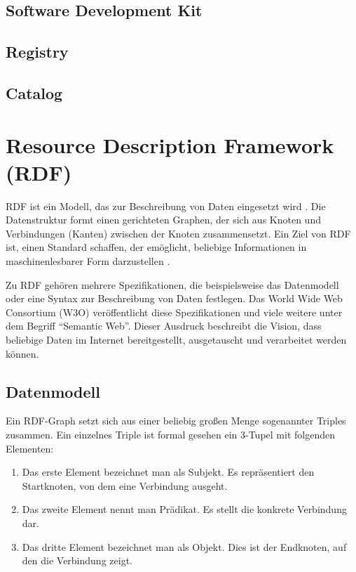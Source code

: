 	\subsection{Software Development Kit}
	\subsection{Registry}
	\subsection{Catalog}

\section{Resource Description Framework (RDF)}

\gls{RDF} ist ein Modell, das zur Beschreibung von Daten eingesetzt wird \cite[vgl.][]{w3c2014rdf}. Die Datenstruktur formt einen gerichteten Graphen, der sich aus Knoten und Verbindungen (Kanten) zwischen der Knoten zusammensetzt. Ein Ziel von RDF ist, einen Standard schaffen, der emöglicht, beliebige Informationen in maschinenlesbarer Form darzustellen \cite[vgl.][Sektion 2]{w3c2014rdfprimer}.

Zu RDF gehören mehrere Spezifikationen, die beispielsweise das Datenmodell oder eine Syntax zur Beschreibung von Daten festlegen. Das World Wide Web Consortium (W3O) veröffentlicht diese Spezifikationen und viele weitere unter dem Begriff "`Semantic Web"'. Dieser Ausdruck beschreibt die Vision, dass beliebige Daten im Internet bereitgestellt, ausgetauscht und verarbeitet werden können. \cite[vgl.][]{w3c2014semanticweb}

	\subsection{Datenmodell}
	
	Ein RDF-Graph setzt sich aus einer beliebig großen Menge sogenannter Triples zusammen. \cite[vgl.][Sektion 3.1]{w3c2014rdfconcepts} Ein einzelnes Triple ist formal gesehen ein 3-Tupel mit folgenden Elementen:
	\begin{enumerate}
		\item Das erste Element bezeichnet man als Subjekt. Es repräsentiert den Startknoten, von dem eine Verbindung ausgeht.
		\item Das zweite Element nennt man Prädikat. Es stellt die konkrete Verbindung dar.
		\item Das dritte Element bezeichnet man als Objekt. Dies ist der Endknoten, auf den die Verbindung zeigt. 
	\end{enumerate}
	
